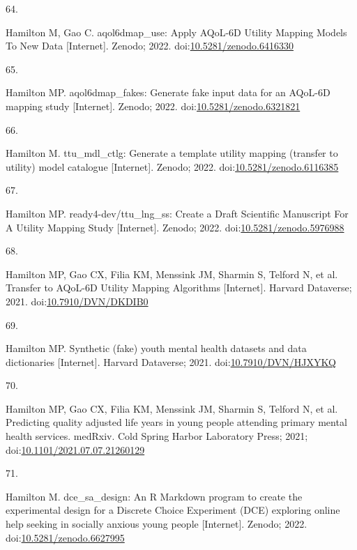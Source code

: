 \documentclass[
]{article}
\newlength{\cslhangindent}
\newlength{\csllabelwidth}
\newlength{\cslentryspacingunit} %
\newenvironment{CSLReferences}[2] %
 {%
  \setlength{\parindent}{0pt}
  \ifodd #1
  \let\oldpar\par
  \def\par{\hangindent=\cslhangindent\oldpar}
  \fi
  \setlength{\parskip}{#2\cslentryspacingunit}
 }%
 {}
\newcommand{\CSLLeftMargin}[1]{\parbox[t]{\csllabelwidth}{#1}}
\newcommand{\CSLRightInline}[1]{\parbox[t]{\linewidth - \csllabelwidth}{#1}\break}
\begin{document}
\begin{CSLReferences}{0}{0}
\leavevmode{}%
\CSLLeftMargin{64. }%
\CSLRightInline{Hamilton M, Gao C. {aqol6dmap\_use: Apply AQoL-6D Utility Mapping Models To New Data} {[}Internet{]}. Zenodo; 2022. doi:\href{https://doi.org/10.5281/zenodo.6416330}{10.5281/zenodo.6416330}}

\leavevmode{}%
\CSLLeftMargin{65. }%
\CSLRightInline{Hamilton MP. {aqol6dmap\_fakes: Generate fake input data for an AQoL-6D mapping study} {[}Internet{]}. Zenodo; 2022. doi:\href{https://doi.org/10.5281/zenodo.6321821}{10.5281/zenodo.6321821}}

\leavevmode{}%
\CSLLeftMargin{66. }%
\CSLRightInline{Hamilton M. {ttu\_mdl\_ctlg: Generate a template utility mapping (transfer to utility) model catalogue} {[}Internet{]}. Zenodo; 2022. doi:\href{https://doi.org/10.5281/zenodo.6116385}{10.5281/zenodo.6116385}}

\leavevmode{}%
\CSLLeftMargin{67. }%
\CSLRightInline{Hamilton MP. {ready4-dev/ttu\_lng\_ss: Create a Draft Scientific Manuscript For A Utility Mapping Study} {[}Internet{]}. Zenodo; 2022. doi:\href{https://doi.org/10.5281/zenodo.5976988}{10.5281/zenodo.5976988}}

\leavevmode{}%
\CSLLeftMargin{68. }%
\CSLRightInline{Hamilton MP, Gao CX, Filia KM, Menssink JM, Sharmin S, Telford N, et al. {Transfer to AQoL-6D Utility Mapping Algorithms} {[}Internet{]}. Harvard Dataverse; 2021. doi:\href{https://doi.org/10.7910/DVN/DKDIB0}{10.7910/DVN/DKDIB0}}

\leavevmode{}%
\CSLLeftMargin{69. }%
\CSLRightInline{Hamilton MP. {Synthetic (fake) youth mental health datasets and data dictionaries} {[}Internet{]}. Harvard Dataverse; 2021. doi:\href{https://doi.org/10.7910/DVN/HJXYKQ}{10.7910/DVN/HJXYKQ}}

\leavevmode{}%
\CSLLeftMargin{70. }%
\CSLRightInline{Hamilton MP, Gao CX, Filia KM, Menssink JM, Sharmin S, Telford N, et al. Predicting quality adjusted life years in young people attending primary mental health services. medRxiv. Cold Spring Harbor Laboratory Press; 2021; doi:\href{https://doi.org/10.1101/2021.07.07.21260129}{10.1101/2021.07.07.21260129}}

\leavevmode{}%
\CSLLeftMargin{71. }%
\CSLRightInline{Hamilton M. {dce\_sa\_design: An R Markdown program to create the experimental design for a Discrete Choice Experiment (DCE) exploring online help seeking in socially anxious young people} {[}Internet{]}. Zenodo; 2022. doi:\href{https://doi.org/10.5281/zenodo.6627995}{10.5281/zenodo.6627995}}


\end{CSLReferences}
\end{document}
